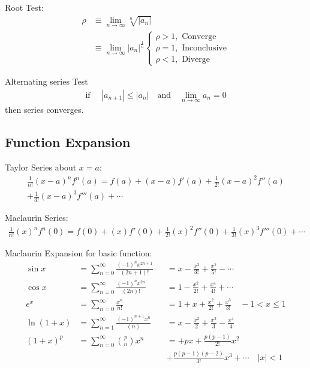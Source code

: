 \documentclass[../main.tex]{subfiles}
\begin{document}
Root Test:
\begin{align*}
    \rho&\equiv\lim_{n\to \infty} \sqrt[ n]{|a_n|}\\
    &\equiv \lim_{n\to \infty} |a_n|^{\frac{1}{n}}
    \begin{cases}
        \rho > 1,\textrm{ Converge}\\\rho = 1,\textrm{ Inconclusive}\\\rho < 1,\textrm{ Diverge}
    \end{cases}
\end{align*}

Alternating series Test
\begin{align*}
    \textrm{if }\quad|a_{n+1}|\leq|a_n|\quad \textrm{and} \quad\lim_{n\to \infty} a_n=0
\end{align*}
then series converges.

\subsection*{Function Expansion}
Taylor Series about $x=a$:
\begin{multline*}
    \frac{1}{n!}(x-a)^n f^{n}(a) = f(a)+(x-a)f'(a)+\frac{1}{2!}(x-a)^2f''(a)\\
        +\frac{1}{3!}(x-a)^3f'''(a)+\cdots
\end{multline*}

Maclaurin Series:
\begin{multline*}
    \frac{1}{n!}(x)^n f^{n}(0) = f(0)+(x)f'(0)+\frac{1}{2!}(x)^2f''(0)
    +\frac{1}{3!}(x)^3f'''(0)+\cdots
\end{multline*}

Maclaurin Expansion for basic function:
\begin{align*}
    \sin x&= \sum_{n=0}^{\infty}\frac{(-1)^nx^{2n+1}}{(2n+1)!} &&=x-\frac{x^3}{3!}+\frac{x^5}{5!}-\cdots\\
    \cos x&= \sum_{n=0}^{\infty}\frac{(-1)^nx^{2n}}{(2n)!}&& = 1-\frac{x^2}{2!}+\frac{x^4}{4!}+\cdots\\
    e^x&= \sum_{n=0}^{\infty}\frac{x^{n}}{n!}               &&=1+x+\frac{x^2}{2!}+\frac{x^3}{3!}\quad-1<x\leq1\\
    \ln (1+x)&= \sum_{n=1}^{\infty} \frac{(-1)^{n+1}x^{n}}{(n)}&& =x-\frac{x^2}{2}+\frac{x^3}{3}-\frac{x^4}{4}\\
    (1+x)^p&=\sum_{n=0}^{\infty}\binom{p}{n}x^n&&=+px+\frac{p(p-1)}{2!}x^2\\
    &&&+\frac{p(p-1)(p-2)}{3!}x^3+\cdots\quad |x|<1
\end{align*}
\end{document}
